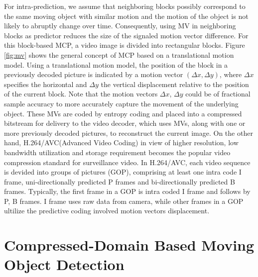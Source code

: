 For intra-prediction, we assume that neighboring blocks possibly correspond to the same moving object with similar motion and the motion of the object is not likely to abruptly change over time. Consequently, using MV in neighboring blocks as predictor reduces the size of the signaled motion vector difference. For this block-based MCP, a video image is divided into rectangular blocks. Figure \ref{fig:mv} shows the general concept of MCP based on a translational motion model. Using a translational motion model, the position of the block in a previously decoded picture is indicated by a motion vector $(\Delta x, \Delta y)$, where $\Delta x$ specifies the horizontal and $\Delta y$ the vertical displacement relative to the position of the current block. Note that the motion vectors $\Delta x$, $\Delta y$ could be of fractional sample accuracy to more accurately capture the movement of the underlying object. These MVs are coded by entropy coding and placed into a compressed bitstream for delivery to the video decoder, which uses MVs, along with one or more previously decoded pictures, to reconstruct the current image. On the other hand, H.264/AVC(Advanced Video Coding) in view of higher resolution, low bandwidth utilization and storage requirement becomes the popular video compression standard for surveillance video. In H.264/AVC, each video sequence is devided into groups of pictures (GOP), comprising at least one intra code I frame, uni-directionally predicted P frames and bi-directionally predicted B frames. Typically, the first frame in a GOP is intra coded I frame and follows by P, B frames. I frame uses raw data from camera, while other frames in a GOP ultilize the predictive coding involved motion vectors displacement. \\
\section{Compressed-Domain Based Moving Object Detection}





